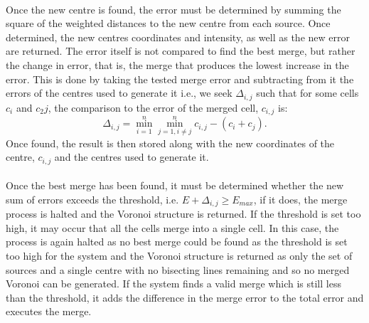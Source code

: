 \\
Once the new centre is found, the error must be determined by summing the square of the weighted distances to the new centre from each source. Once determined, the new centres coordinates and intensity, as well as the new error are returned. The error itself is not compared to find the best merge, but rather the change in error, that is, the merge that produces the lowest increase in the error. This is done by taking the tested merge error and subtracting from it the errors of the centres used to generate it i.e., we seek $\Delta_{i,j}$ such that for some cells $c_i$ and $c_2j$, the comparison to the error of the merged cell, $c_{i,j}$ is:
\begin{equation}
	\Delta_{i,j} = \min^n_{i = 1}\min^n_{j = 1, i \neq j}c_{i,j} - (c_i + c_j).
\end{equation}
Once found, the result is then stored along with the new coordinates of the centre, $c_{i,j}$ and the centres used to generate it.
\\
\\
Once the best merge has been found, it must be determined whether the new sum of errors exceeds the threshold, i.e. $E + \Delta_{i,j} \geq E_{max}$, if it does, the merge process is halted and the Voronoi structure is returned. If the threshold is set too high, it may occur that all the cells merge into a single cell. In this case, the process is again halted as no best merge could be found as the threshold is set too high for the system and the Voronoi structure is returned as only the set of sources and a single centre with no bisecting lines remaining and so no merged Voronoi can be generated. If the system finds a valid merge which is still less than the threshold, it adds the difference in the merge error to the total error and executes the merge.

